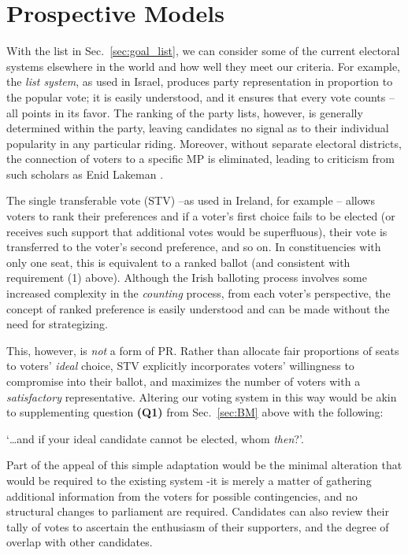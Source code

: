 \documentclass[DIV=calc, paper=a4, fontsize=11pt, twocolumn]{scrartcl}	 %
\begin{document}
\section{Prospective Models}
\label{sec:alt_models}

With the list in Sec.~\ref{sec:goal_list}, we can consider some of the current electoral systems elsewhere in the world and how well they meet our criteria. For example, the \emph{list system}, as used in Israel, produces party representation in proportion to the popular vote; it is easily understood, and it ensures that every vote counts \---all points in its favor. 
The ranking of the party lists, however, is generally determined within the party, leaving candidates no signal as to their individual popularity in any particular riding. Moreover, without separate electoral districts, the connection of voters to a specific MP is eliminated, leading to criticism from such scholars as Enid Lakeman\cite{Lakeman}
.

The single transferable vote (STV) \---as used in Ireland, for example\cite{Irish_howto_vote_doc}
\--- allows voters to  rank their preferences and if a voter's first choice fails to be elected (or receives such support that additional votes would be superfluous), their vote is transferred to the voter's second preference, and so on. In constituencies with only one seat, this is equivalent to a ranked ballot (and consistent with requirement (1) above). 
Although the Irish balloting process involves some increased complexity in the \emph{counting} process, from each voter's perspective, the concept of ranked preference is easily understood and can be made without the need for strategizing.

This, however, is \emph{not} a form of PR. 
Rather than allocate fair proportions of seats to voters' \emph{ideal} choice, STV explicitly incorporates voters' willingness to compromise into their ballot, and maximizes the number of voters with a \emph{satisfactory} representative.
Altering our voting system in this way would be akin to supplementing question \textbf{(Q1)} from Sec.~\ref{sec:BM} above with the following: 

\begin{tcolorbox}[colback=white!5!white,colframe=blue!55!black]
`\ldots and if your ideal candidate cannot be elected, whom \emph{then}?'. 
\end{tcolorbox}

Part of the appeal of this simple adaptation would be the minimal alteration that would be required to the existing system \--it is merely a matter of gathering additional information from the voters for possible contingencies, and no structural changes to parliament are required. Candidates can also review their tally of votes to ascertain the enthusiasm of their supporters, and the degree of overlap with other candidates. 
\end{document}

